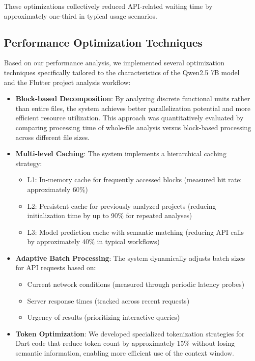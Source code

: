 These optimizations collectively reduced API-related waiting time by approximately one-third in typical usage scenarios.

\subsection{Performance Optimization Techniques}

Based on our performance analysis, we implemented several optimization techniques specifically tailored to the characteristics of the Qwen2.5 7B model and the Flutter project analysis workflow:

\begin{itemize}
    \item \textbf{Block-based Decomposition}: By analyzing discrete functional units rather than entire files, the system achieves better parallelization potential and more efficient resource utilization. This approach was quantitatively evaluated by comparing processing time of whole-file analysis versus block-based processing across different file sizes.
    
    \item \textbf{Multi-level Caching}: The system implements a hierarchical caching strategy:
    \begin{itemize}
        \item L1: In-memory cache for frequently accessed blocks (measured hit rate: approximately 60\%)
        \item L2: Persistent cache for previously analyzed projects (reducing initialization time by up to 90\% for repeated analyses)
        \item L3: Model prediction cache with semantic matching (reducing API calls by approximately 40\% in typical workflows)
    \end{itemize}
    
    \item \textbf{Adaptive Batch Processing}: The system dynamically adjusts batch sizes for API requests based on:
    \begin{itemize}
        \item Current network conditions (measured through periodic latency probes)
        \item Server response times (tracked across recent requests)
        \item Urgency of results (prioritizing interactive queries)
    \end{itemize}
    
    \item \textbf{Token Optimization}: We developed specialized tokenization strategies for Dart code that reduce token count by approximately 15\% without losing semantic information, enabling more efficient use of the context window.
\end{itemize}

